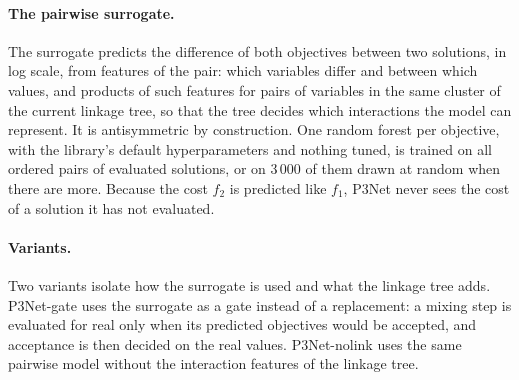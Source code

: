 \paragraph{The pairwise surrogate.} The surrogate predicts the difference of both objectives between two solutions,
in log scale, from features of the pair: which variables differ and between which values, and products of such
features for pairs of variables in the same cluster of the current linkage tree, so that the tree decides which
interactions the model can represent. It is antisymmetric by construction. One random forest per objective, with the
library's default hyperparameters and nothing tuned, is trained on all ordered pairs of evaluated solutions, or on
3\,000 of them drawn at random when there are more. Because the cost $f_2$ is predicted like $f_1$, P3Net never sees
the cost of a solution it has not evaluated.

\paragraph{Variants.} Two variants isolate how the surrogate is used and what the linkage tree adds. P3Net-gate uses
the surrogate as a gate instead of a replacement: a mixing step is evaluated for real only when its predicted
objectives would be accepted, and acceptance is then decided on the real values. P3Net-nolink uses the same pairwise
model without the interaction features of the linkage tree.
